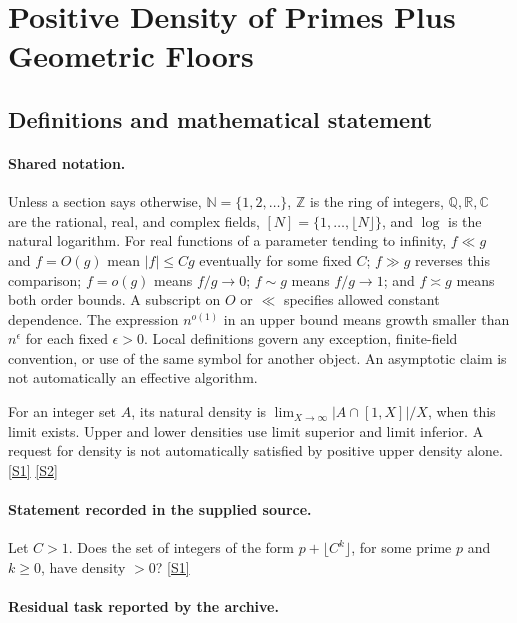 \documentclass[11pt,a4paper]{article}
\newcommand{\N}{\mathbb{N}}
\newcommand{\Z}{\mathbb{Z}}
\newcommand{\Q}{\mathbb{Q}}
\newcommand{\R}{\mathbb{R}}
\newcommand{\C}{\mathbb{C}}
\newcommand{\sref}[2]{\hyperlink{source:#1:#2}{[S#2]}}
\begin{document}
\section{Positive Density of Primes Plus Geometric Floors}\label{statement}


\subsection{Definitions and mathematical statement}

\paragraph{Shared notation.}Unless a section says otherwise, $\N=\{1,2,\ldots\}$,
$\Z$ is the ring of integers, $\Q,\R,\C$ are the rational, real, and complex
fields, $[N]=\{1,\ldots,\lfloor N\rfloor\}$, and $\log$ is the natural
logarithm. For real functions of a parameter tending to infinity,
$f\ll g$ and $f=O(g)$ mean $|f|\leq Cg$ eventually for some fixed $C$;
$f\gg g$ reverses this comparison; $f=o(g)$ means $f/g\to0$;
$f\sim g$ means $f/g\to1$; and $f\asymp g$ means both order bounds.
A subscript on $O$ or $\ll$ specifies allowed constant dependence.
The expression $n^{o(1)}$ in an upper bound means growth smaller than
$n^\epsilon$ for each fixed $\epsilon>0$. Local definitions govern any
exception, finite-field convention, or use of the same symbol for another
object. An asymptotic claim is not automatically an effective algorithm.



For an integer set $A$, its natural density is $\lim_{X\to\infty}|A\cap[1,X]|/X$, when this limit exists. Upper and lower densities use limit superior and limit inferior. A request for density is not automatically satisfied by positive upper density alone. \sref{statement}{1} \sref{statement}{2}

\paragraph{Statement recorded in the supplied source.}
Let $C>1$. Does the set of integers of the form $p+\lfloor C^k\rfloor$, for some prime $p$ and $k\geq 0$, have density $>0$? \sref{statement}{1}

\paragraph{Residual task reported by the archive.}
\end{document}
